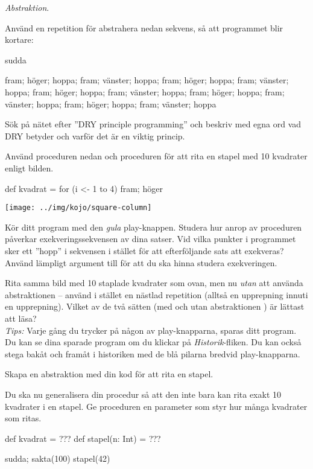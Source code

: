 \Task \textit{Abstraktion}.

\Subtask Använd en repetition för abstrahera nedan sekvens, så att programmet blir kortare:
\begin{Code}
sudda

fram; höger; hoppa; fram; vänster; hoppa; fram; höger;
hoppa; fram; vänster; hoppa; fram; höger; hoppa; fram;
vänster; hoppa; fram; höger; hoppa; fram; vänster; hoppa;
fram; höger; hoppa; fram; vänster; hoppa
\end{Code}

\Subtask\Pen Sök på nätet efter ''DRY principle programming'' och beskriv med egna ord vad DRY betyder och varför det är en viktig princip.

\Subtask Använd proceduren  nedan och proceduren  för att rita en stapel med 10 kvadrater enligt bilden.

\begin{Code}
def kvadrat = for (i <- 1 to 4) {fram; höger}
\end{Code}

\texttt{[image: ../img/kojo/square-column]}

\Subtask Kör ditt program med den \emph{gula} play-knappen. Studera hur anrop av proceduren  påverkar exekveringssekvensen av dina satser. Vid vilka punkter i programmet sker ett ''hopp'' i sekvensen i stället för att efterföljande sats att exekveras? Använd lämpligt argument till  för att du ska hinna studera exekveringen.

\Subtask Rita samma bild med 10 staplade kvadrater som ovan, men nu \emph{utan} att använda abstraktionen  -- använd i stället en nästlad repetition (alltså en upprepning innuti en upprepning). Vilket av de två sätten (med och utan abstraktionen ) är lättast att läsa?\\ \emph{Tips:} Varje gång du trycker på någon av play-knapparna, sparas ditt program. Du kan se dina sparade program om du klickar på \emph{Historik}-fliken. Du kan också stega bakåt och framåt i historiken med de blå pilarna bredvid play-knapparna.

\Subtask Skapa en abstraktion  med din kod för att rita en stapel.

\Subtask Du ska nu generalisera din procedur så att den inte bara kan rita exakt 10 kvadrater i en stapel. Ge proceduren  en parameter  som styr hur många kvadrater som ritas.
\begin{Code}
def kvadrat = ???
def stapel(n: Int) = ???

sudda; sakta(100)
stapel(42)
\end{Code}

